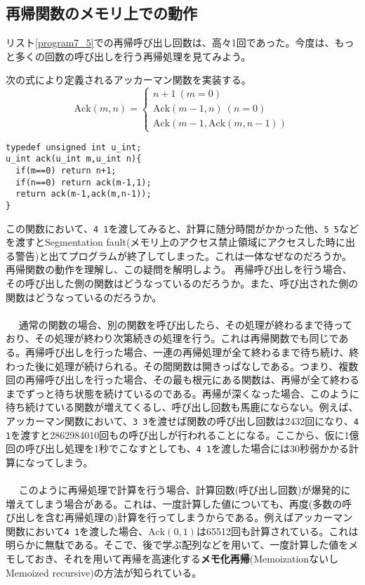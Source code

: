 \subsection{再帰関数のメモリ上での動作}
リスト\ref{program7_5}での再帰呼び出し回数は、高々1回であった。今度は、もっと多くの回数の呼び出しを行う再帰処理を見てみよう。
\begin{boxnote}
\begin{multicols}{2}
次の式により定義されるアッカーマン関数を実装する。
\[
\mathrm{Ack}(m,n)=\begin{cases}
    n+1\ (m=0)\\
    \mathrm{Ack}(m-1,n)\ (n=0)\\
    \mathrm{Ack}(m-1,\mathrm{Ack}(m,n-1))
    \end{cases}
\]
\begin{lstlisting}[caption=アッカーマン関数,label=program7_6]
typedef unsigned int u_int;
u_int ack(u_int m,u_int n){
  if(m==0) return n+1;
  if(n==0) return ack(m-1,1);
  return ack(m-1,ack(m,n-1));
}
\end{lstlisting}
\end{multicols}
\end{boxnote}
この関数において、\verb|4 1|を渡してみると、計算に随分時間がかかった他、\verb|5 5|などを渡すとSegmentation fault(メモリ上のアクセス禁止領域にアクセスした時に出る警告)と出てプログラムが終了してしまった。これは一体なぜなのだろうか。再帰関数の動作を理解し、この疑問を解明しよう。
再帰呼び出しを行う場合、その呼び出した側の関数はどうなっているのだろうか。また、呼び出された側の関数はどうなっているのだろうか。
\\ \\　
通常の関数の場合、別の関数を呼び出したら、その処理が終わるまで待っており、その処理が終わり次第続きの処理を行う。これは再帰関数でも同じである。再帰呼び出しを行った場合、一連の再帰処理が全て終わるまで待ち続け、終わった後に処理が続けられる。その間関数は開きっぱなしである。つまり、複数回の再帰呼び出しを行った場合、その最も根元にある関数は、再帰が全て終わるまでずっと待ち状態を続けているのである。再帰が深くなった場合、このように待ち続けている関数が増えてくるし、呼び出し回数も馬鹿にならない。例えば、アッカーマン関数において、\verb|3 3|を渡せば関数の呼び出し回数は2432回になり、\verb|4 1|を渡すと2862984010回もの呼び出しが行われることになる。ここから、仮に1億回の呼び出し処理を1秒でこなすとしても、\verb|4 1|を渡した場合には30秒弱かかる計算になってしまう。
\\ \\　
このように再帰処理で計算を行う場合、計算回数(呼び出し回数)が爆発的に増えてしまう場合がある。これは、一度計算した値についても、再度(多数の呼び出しを含む再帰処理の)計算を行ってしまうからである。例えばアッカーマン関数において\verb|4 1|を渡した場合、$\mathrm{Ack}(0,1)$は65512回も計算されている。これは明らかに無駄である。そこで、後で学ぶ配列などを用いて、一度計算した値をメモしておき、それを用いて再帰を高速化する\textbf{メモ化再帰}(MemoizationないしMemoized recursive)の方法が知られている。

